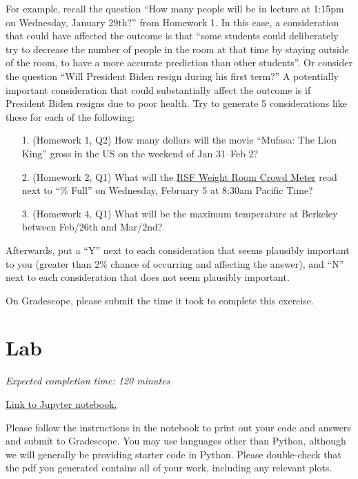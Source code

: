 \documentclass[11pt]{article}
\begin{document}
For example, recall the question ``How many people will be in lecture at 1:15pm on Wednesday, January 29th?'' from Homework 1. In this case, a consideration that could have affected the outcome is that ``some students could deliberately try to decrease the number of people in the room at that time by staying outside of the room, to have a more accurate prediction than other students''. Or consider the question ``Will President Biden resign during his first term?'' A potentially important consideration that could substantially affect the outcome is if President Biden resigns due to poor health. Try to generate 5 considerations like these for each of the following:

\begin{enumerate}
	\item[1.] (Homework 1, Q2) How many dollars will the movie ``Mufasa: The Lion King'' gross in the US on the weekend of Jan 31–Feb 2?

	\item[2.] (Homework 2, Q1) What will the \href{https://recwell.berkeley.edu/rsf-weight-room-crowd-meter/}{RSF Weight Room Crowd Meter} read next to ``\% Full'' on Wednesday, February 5 at 8:30am Pacific Time?

	\item[3.] (Homework 4, Q1) What will be the maximum temperature at Berkeley between Feb/26th and Mar/2nd?



\end{enumerate}

Afterwards, put a ``Y'' next to each consideration that seems plausibly important to you (greater than 2\% chance of occurring and affecting the answer), 
and ``N'' next to each consideration that does not seem plausibly important.

On Gradescope, please submit the time it took to complete this exercise.

\section*{Lab}

\emph{Expected completion time: 120 minutes}

\href{https://datahub.berkeley.edu/hub/user-redirect/git-pull?repo=https%3A%2F%2Fgithub.com%2Frsha256%2Fforecasting-class-sp24&branch=main&urlpath=tree%2Fforecasting-class-sp24%2Fhw%2Fhw4%2Fhw4lab.ipynb}{Link to Jupyter notebook.}

Please follow the instructions in the notebook to print out your code and answers and submit to Gradescope. You may use languages other than Python, although we will generally be providing starter code in Python. Please double-check that the pdf you generated contains all of your work, including any relevant plots.
\end{document}
